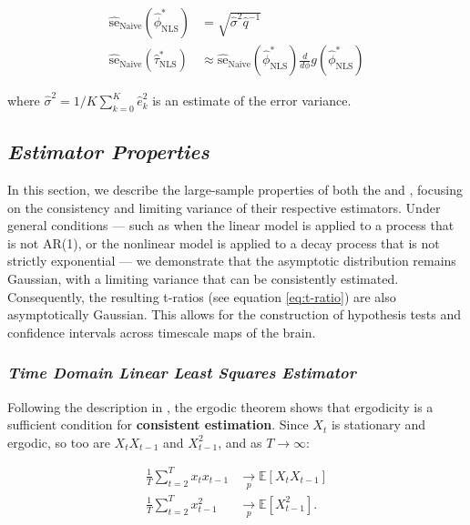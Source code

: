 \documentclass[main.tex]{subfiles}
\begin{document}
\begin{align} 
    \widehat{\text{se}}_\text{Naive}(\hat\phi^*_{\scriptscriptstyle\text{NLS}}) &= \sqrt{\hat\sigma^2 \hat q^{-1}}\\
    \widehat{\text{se}}_\text{Naive}(\hat\tau^*_{\scriptscriptstyle\text{NLS}}) &\approx \widehat{\text{se}}_{\text{Naive}}(\hat\phi^*_{\scriptscriptstyle\text{NLS}}) \frac{d}{d\phi} g(\hat\phi^*_{\scriptscriptstyle\text{NLS}})
\end{align}

\noindent where $\hat\sigma^2 = 1/K \sum_{k=0}^K \hat e_k^2$ is an estimate of the error variance.\\

\subsection{\textit{Estimator Properties}}
In this section, we describe the large-sample properties of both the  and , focusing on the consistency and limiting variance of their respective estimators. Under general conditions --- such as when the linear model is applied to a process that is not AR(1), or the nonlinear model is applied to a decay process that is not strictly exponential --- we demonstrate that the asymptotic distribution remains Gaussian, with a limiting variance that can be consistently estimated. Consequently, the resulting t-ratios (see equation \eqref{eq:t-ratio}) are also asymptotically Gaussian. This allows for the construction of hypothesis tests and confidence intervals across timescale maps of the brain.

\subsubsection{\normalfont\textit{Time Domain Linear Least Squares Estimator}}
Following the description in \citet[theorem~14.29]{hansen_econometrics_2022}, the ergodic theorem shows that ergodicity is a sufficient condition for \textbf{consistent estimation}. Since $X_t$ is stationary and ergodic, so too are $X_t X_{t-1}$ and $X_{t-1}^2$, and as $T \to \infty$:

\begin{align}
    \frac{1}{T} \sum_{t=2}^T x_t x_{t-1} &\underset{p}{\to} \mathbb{E}[X_t X_{t-1}]\\
    \frac{1}{T} \sum_{t=2}^T x_{t-1}^2 &\underset{p}{\to} \mathbb{E}[X_{t-1}^2].
\end{align}
\end{document}
